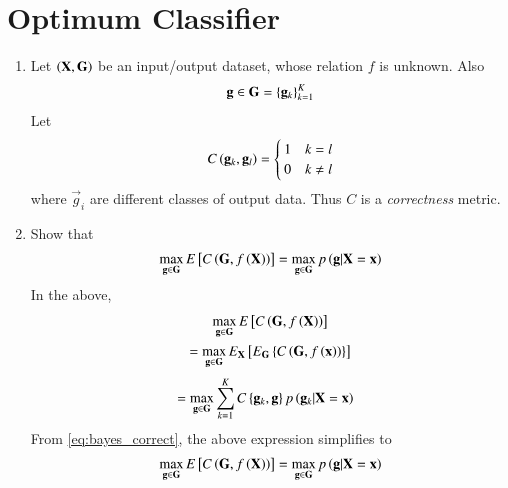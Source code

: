 \documentclass[journal,12pt,twocolumn]{IEEEtran}
\renewcommand\thesection{\arabic{section}}
\begin{document}
\section{Optimum Classifier}
\begin{enumerate}[label=\thesection.\arabic*
,ref=\thesection.\theenumi]

\item Let $\left(\mathbf{X},\mathbf{G}\right)$ be an input/output dataset, whose relation $f$ is unknown. Also
\begin{align}
\mathbf{g}\in\mathbf{G} = \left\{\mathbf{g}_k\right\}_{k=1}^{K}
\end{align}
Let 
\begin{align}
\label{eq:bayes_correct}
C\left(\mathbf{g}_k,\mathbf{g}_l\right) =
\begin{cases}
1 & k= l
\\
0 & k\ne l
\end{cases}
\end{align}
%
where $\vec{g}_i$ are different classes of output data. Thus $C$ is a {\em correctness} metric.
\item Show that 
\begin{align}
\max_{\mathbf{g}\in\mathbf{G}}E{}\left[C\left(\mathbf{G},f\left(\mathbf{X}\right)\right)\right] 
= \max_{\mathbf{g}\in\mathbf{G}}p\left(\mathbf{g}|\mathbf{X}=\mathbf{x}\right) 
\end{align}
\solution In the above, 
\begin{multline}
\max_{\mathbf{g}\in\mathbf{G}}E{}\left[C\left(\mathbf{G},f\left(\mathbf{X}\right)\right)\right] 
\\
= \max_{\mathbf{g}\in\mathbf{G}}E_\mathbf{X}{}\left[E_{\mathbf{G}}\left\{C\left(\mathbf{G},f\left(\mathbf{x}\right)\right)\right\}\right] 
\end{multline}
%
\begin{align}
&=\max_{\mathbf{g}\in\mathbf{G}}\sum_{k=1}^{K}C\left\{\mathbf{g}_k,\mathbf{g}\right\}p\left(\mathbf{g}_k|\mathbf{X}=\mathbf{x}\right) 
\end{align}
From \eqref{eq:bayes_correct}, the above expression simplifies to
\begin{align}
\max_{\mathbf{g}\in\mathbf{G}}E{}\left[C\left(\mathbf{G},f\left(\mathbf{X}\right)\right)\right] =\max_{\mathbf{g}\in\mathbf{G}}p\left(\mathbf{g}|\mathbf{X}=\mathbf{x}\right) 
\end{align}
%
\end{enumerate}
\end{document}
